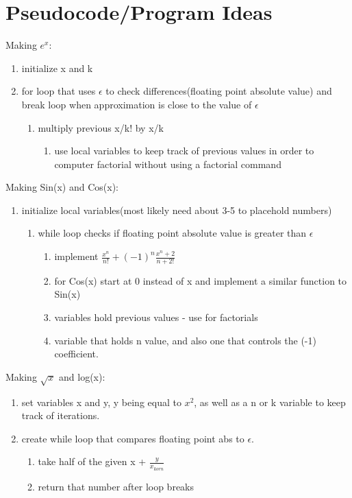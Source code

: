 \documentclass[11pt]{article}
\begin{document}
\section{Pseudocode/Program Ideas}\label{ss:pseudocode}
Making \(e^x\):
\begin{enumerate}
	\item initialize x and k
	\item for loop that uses $\epsilon$ to check differences(floating point absolute value) and break loop when approximation is close to the value of $\epsilon$
	\begin{enumerate}
		\item  multiply previous x/k! by x/k
			\begin{enumerate}
				\item use local variables to keep track of previous values in order to computer factorial without using a factorial command
			\end{enumerate}
	\end{enumerate}
\end{enumerate}
Making Sin(x) and Cos(x):
\begin{enumerate}
	\item initialize local variables(most likely need about 3-5 to placehold numbers)
		\begin{enumerate}
			\item while loop checks if floating point absolute value is greater than $\epsilon$
			\begin{enumerate}
				\item implement \(\frac{x^n}{n!} + (-1)^n \frac{x^n+2}{n+2!}\)
				\item for Cos(x) start at 0 instead of x and implement a similar function to Sin(x) 
				\item variables hold previous values - use for factorials
				\item variable that holds n value, and also one that controls the (-1) coefficient.
			\end{enumerate}
		\end{enumerate}
\end{enumerate}
Making \(\sqrt{x}\) and log(x):
\begin{enumerate}
	\item set variables x and y, y being equal to \(x^2\), as well as a n or k variable to keep track of iterations.
	\item create while loop that compares floating point abs to $\epsilon$.
	\begin{enumerate}
		\item take half of the given x + \(\frac{y}{x_{k or n}}\)
		\item return that number after loop breaks
	
	\end{enumerate}
\end{enumerate}
\end{document}
